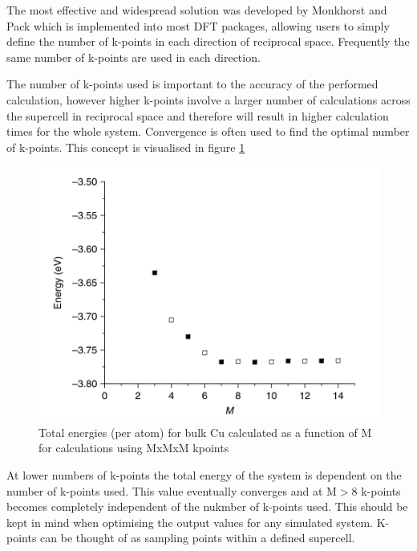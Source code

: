 The most effective and widespread solution was developed by Monkhorst and Pack which is implemented into most DFT packages, allowing users to simply define the number of k-points in each direction of reciprocal space. Frequently the same number of k-points are used in each direction. \cite{doi:10.1002/9780470447710.ch4}

The number of k-points used is important to the accuracy of the performed calculation, however higher k-points involve a larger number of calculations across the supercell in reciprocal space and therefore will result in higher calculation times for the whole system. \cite{doi:10.1002/9780470447710.ch4} Convergence is often used to find the optimal number of k-points. This concept is visualised in figure \ref{converge}

\begin{figure}[H]
    \includegraphics[width=\linewidth]{figures/convergereal.png}
    \caption{Total energies (per atom) for bulk Cu calculated as a function of M for calculations using MxMxM kpoints \cite{doi:10.1002/9780470447710.ch4}}
    \label{converge}
  \end{figure}

At lower numbers of k-points the total energy of the system is dependent on the number of k-points used. This value eventually converges and at M$>$8 k-points becomes completely independent of the nukmber of k-points used. This should be kept in mind when optimising the output values for any simulated system. K-points can be thought of as sampling points within a defined supercell. \cite{doi:10.1002/9780470447710.ch2}

